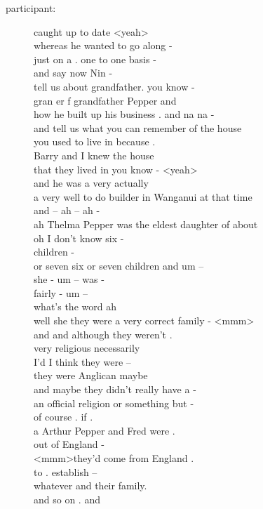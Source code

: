 \documentclass{article}
\newcommand{\turn}[2]{
\item[#1:] #2
}
\begin{document}
\begin{description}
\turn{participant}{caught up to date \textless yeah\textgreater \\
whereas he wanted to go along -\\
just on a . one to one basis -\\
and say now Nin -\\
tell us about grandfather. you know -\\
gran er f grandfather Pepper and\\
how he built up his business . and na na -\\
and tell us what you can remember of the house\\
you used to live in because .\\
Barry and I knew the house\\
that they lived in you know - \textless yeah\textgreater \\
and he was a very actually\\
a very well to do builder in Wanganui at that time\\
and -- ah -- ah -\\
ah Thelma Pepper was the eldest daughter of about\\
oh I don't know six -\\
children -\\
or seven six or seven children and um --\\
she - um -- was -\\
fairly - um --\\
what's the word ah\\
well she they were a very correct family - \textless mmm\textgreater \\
and and although they weren't .\\
very religious necessarily\\
I'd I think they were --\\
they were Anglican maybe\\
and maybe they didn't really have a -\\
an official religion or something but -\\
of course . if .\\
a Arthur Pepper and Fred were .\\
out of England -\\
\textless mmm\textgreater  they'd come from England .\\
to . establish --\\
whatever and their family.\\
and so on . and\\
}
\end{description}
\end{document}
